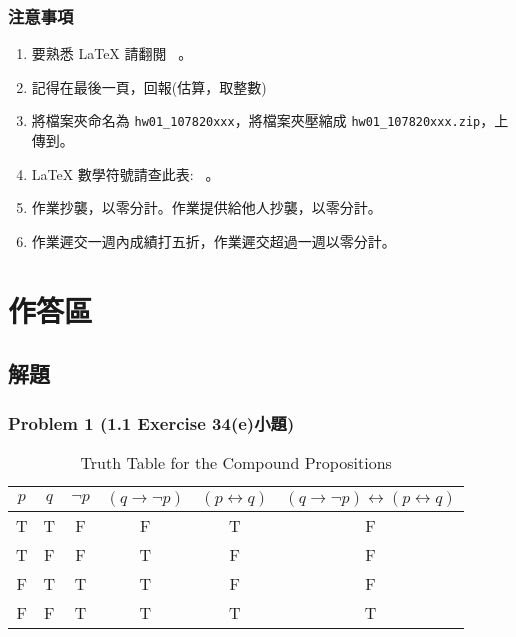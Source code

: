 \documentclass[14pt,hyperref={bookmarks=false}]{beamer}
\begin{document}
	\begin{frame}
	\frametitle{注意事項}
	\fontsize{10}{10pt}\selectfont
	\begin{enumerate}[label=(\alph*)]
	\item 要熟悉 LaTeX 請翻閱 \ 。
	\item 記得在最後一頁，回報\selectfont \color{red}{完成作業小時數}(估算，取整數)\selectfont \color{black}{。}
	\item 將檔案夾命名為 \texttt{hw01\_107820xxx}，將檔案夾壓縮成 \texttt{hw01\_107820xxx.zip}，上傳到。
	\item LaTeX 數學符號請查此表: \ 。
	\item 作業抄襲，以零分計。作業提供給他人抄襲，以零分計。
	\item 作業遲交一週內成績打五折，作業遲交超過一週以零分計。
	\end{enumerate}
	\end{frame}

\section{作答區}

	\subsection{解題}
	
	\begin{frame}
	\frametitle{Problem 1 (1.1 Exercise 34(e)小題)}
	\fontsize{10}{10pt}\selectfont
	\begin{table}[]
	\centering
	\caption{Truth Table for the Compound Propositions}
	\label{t1}
	\begin{tabular}{c|c|c|c|c|c}
	\hline
	 $p$ & $q$ & $\neg p$ & $(q \rightarrow \neg p)$ & $(p \leftrightarrow q)$ & $ (q \rightarrow \neg p) \leftrightarrow (p \leftrightarrow q)$  \\ \hline
	 T  & T & F & F & T & F \\ %
	 T  & F & F & T & F & F \\ 
	 F  & T & T & T & F & F \\ 
	 F  & F & T & T & T & T \\ 
	\hline
	\end{tabular}
	\end{table}

	\end{frame}
	
\end{document}
